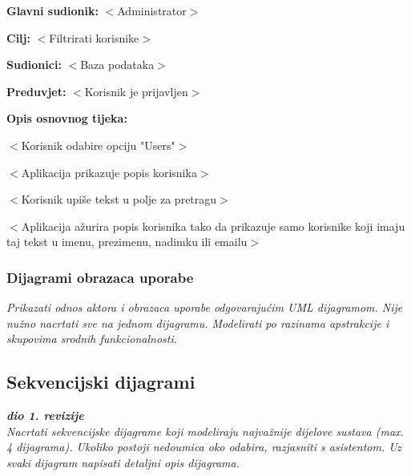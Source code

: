 					\noindent {}
					\begin{packed_item}

						\item \textbf{Glavni sudionik:} $<$Administrator$>$
						\item \textbf{Cilj:} $<$Filtrirati korisnike$>$
						\item \textbf{Sudionici:} $<$Baza podataka$>$
						\item \textbf{Preduvjet:} $<$Korisnik je prijavljen$>$
						\item \textbf{Opis osnovnog tijeka:}

						\item[] \begin{packed_enum}

							\item $<$Korisnik odabire opciju "Users"$>$
							\item $<$Aplikacija prikazuje popis korisnika$>$
							\item $<$Korisnik upiše tekst u polje za pretragu$>$
							\item $<$Aplikacija ažurira popis korisnika tako da prikazuje samo korisnike koji imaju taj tekst u imenu, prezimenu, nadimku ili emailu$>$
						\end{packed_enum}
					\end{packed_item}
					
				\subsubsection{Dijagrami obrazaca uporabe}
					
					\textit{Prikazati odnos aktora i obrazaca uporabe odgovarajućim UML dijagramom. Nije nužno nacrtati sve na jednom dijagramu. Modelirati po razinama apstrakcije i skupovima srodnih funkcionalnosti.}
				\eject		
				
			\subsection{Sekvencijski dijagrami}
				
				\textbf{\textit{dio 1. revizije}}\\
				
				\textit{Nacrtati sekvencijske dijagrame koji modeliraju najvažnije dijelove sustava (max. 4 dijagrama). Ukoliko postoji nedoumica oko odabira, razjasniti s asistentom. Uz svaki dijagram napisati detaljni opis dijagrama.}
				\eject
	
